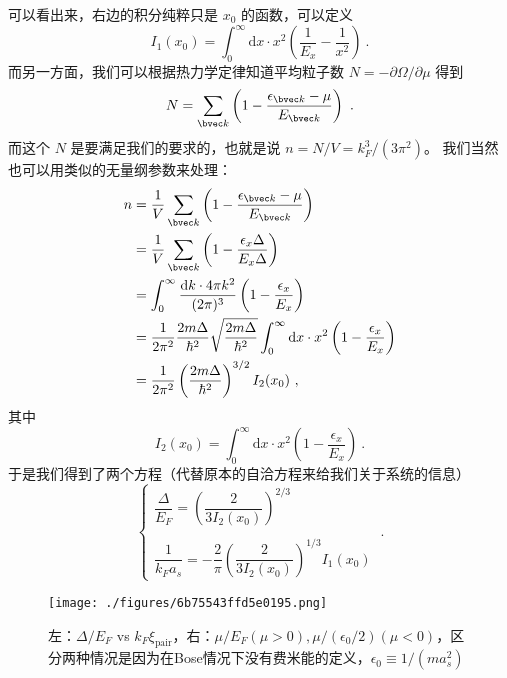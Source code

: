 可以看出来，右边的积分纯粹只是 $x_0$ 的函数，可以定义
\begin{equation}
I_1(x_0) = \int_0^\infty \text{d}x\cdot x^2\left(\frac{1}{E_x}-\frac{1}{x^2}\right)~.
\end{equation}
而另一方面，我们可以根据热力学定律知道平均粒子数 $N=-\partial\Omega/\partial\mu$ 得到
\begin{equation}
N = \sum_{\bvec k}\left(1-\frac{\epsilon_{\bvec k}-\mu}{E_{\bvec k}}\right)~.
\end{equation}
而这个 $N$ 是要满足我们的要求的，也就是说 $n=N/V=k_F^3/(3\pi^2)$。 我们当然也可以用类似的无量纲参数来处理：
\begin{equation}
\begin{split}
n &= \frac{1}{V}\sum_{\bvec k}\left(1-\frac{\epsilon_{\bvec k}-\mu}{E_{\bvec k}}\right)\\
&=\frac{1}{V}\sum_{\bvec k}\left(1-\frac{\epsilon_x{\Delta}}{E_x{\Delta}}\right)\\ %
&=\int_0^\infty\frac{\text{d}k \cdot 4\pi k^2}{(2\pi)^3}\left(1-\frac{\epsilon_x}{E_x}\right)\\
&=\frac{1}{2\pi^2}\frac{2m\Delta}{\hbar^2}\sqrt{\frac{2m\Delta}{\hbar^2}}\int_0^\infty\text{d}x\cdot x^2\left(1-\frac{\epsilon_x}{E_x}\right)\\
&=\frac{1}{2\pi^2}\left(\frac{2m\Delta}{\hbar^2}\right)^{3/2}I_2(x_0)~,
\end{split}
\end{equation}
其中
\begin{equation}
I_2(x_0)=\int_0^\infty \text{d}x\cdot x^2\left(1-\frac{\epsilon_x}{E_x}\right)~.
\end{equation}
于是我们得到了两个方程（代替原本的自洽方程来给我们关于系统的信息）
\begin{equation}
\begin{cases}
\dfrac{\Delta}{E_F} = \left(\dfrac{2}{3I_2(x_0)}\right)^{2/3}\\
\ \\
\dfrac{1}{k_Fa_s} = -\dfrac{2}{\pi}\left(\dfrac{2}{3I_2(x_0)}\right)^{1/3}I_1(x_0)
\end{cases}
~.
\end{equation}

\begin{figure}[ht]
\centering
\texttt{[image: ./figures/6b75543ffd5e0195.png]}
\caption{左：$\Delta/E_F$ vs $k_F\xi_{\text{pair}}$，右：$\mu/E_F(\mu>0), \mu/(\epsilon_0/2)(\mu<0)$，区分两种情况是因为在Bose情况下没有费米能的定义，$\epsilon_0\equiv1/(ma_s^2)$} \label{fig_BCSBEC_1}
\end{figure}

